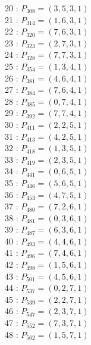 \documentclass{article}
\begin{document}
{\begin{multicols}{2}
20 : $P_{308}=( 3, 5, 3, 1 )$\\
21 : $P_{314}=( 1, 6, 3, 1 )$\\
22 : $P_{320}=( 7, 6, 3, 1 )$\\
23 : $P_{323}=( 2, 7, 3, 1 )$\\
24 : $P_{328}=( 7, 7, 3, 1 )$\\
25 : $P_{354}=( 1, 3, 4, 1 )$\\
26 : $P_{381}=( 4, 6, 4, 1 )$\\
27 : $P_{384}=( 7, 6, 4, 1 )$\\
28 : $P_{385}=( 0, 7, 4, 1 )$\\
29 : $P_{392}=( 7, 7, 4, 1 )$\\
30 : $P_{411}=( 2, 2, 5, 1 )$\\
31 : $P_{413}=( 4, 2, 5, 1 )$\\
32 : $P_{418}=( 1, 3, 5, 1 )$\\
33 : $P_{419}=( 2, 3, 5, 1 )$\\
34 : $P_{441}=( 0, 6, 5, 1 )$\\
35 : $P_{446}=( 5, 6, 5, 1 )$\\
36 : $P_{453}=( 4, 7, 5, 1 )$\\
37 : $P_{480}=( 7, 2, 6, 1 )$\\
38 : $P_{481}=( 0, 3, 6, 1 )$\\
39 : $P_{487}=( 6, 3, 6, 1 )$\\
40 : $P_{493}=( 4, 4, 6, 1 )$\\
41 : $P_{496}=( 7, 4, 6, 1 )$\\
42 : $P_{498}=( 1, 5, 6, 1 )$\\
43 : $P_{501}=( 4, 5, 6, 1 )$\\
44 : $P_{537}=( 0, 2, 7, 1 )$\\
45 : $P_{539}=( 2, 2, 7, 1 )$\\
46 : $P_{547}=( 2, 3, 7, 1 )$\\
47 : $P_{552}=( 7, 3, 7, 1 )$\\
48 : $P_{562}=( 1, 5, 7, 1 )$\\
\end{multicols}
}
\end{document}
